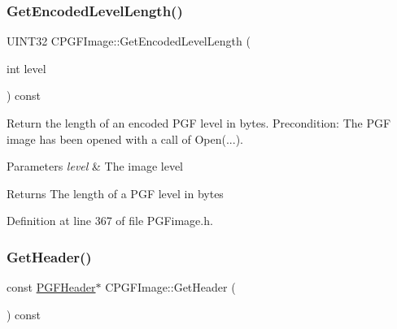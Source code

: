 \subsubsection{\texorpdfstring{GetEncodedLevelLength()}{GetEncodedLevelLength()}}
{\footnotesize\ttfamily U\+I\+N\+T32 C\+P\+G\+F\+Image\+::\+Get\+Encoded\+Level\+Length (\begin{DoxyParamCaption}\item[{int}]{level }\end{DoxyParamCaption}) const\hspace{0.3cm}{\ttfamily [inline]}}

Return the length of an encoded P\+GF level in bytes. Precondition\+: The P\+GF image has been opened with a call of Open(...). 
\begin{DoxyParams}{Parameters}
{\em level} & The image level \\
\hline
\end{DoxyParams}
\begin{DoxyReturn}{Returns}
The length of a P\+GF level in bytes 
\end{DoxyReturn}


Definition at line 367 of file P\+G\+Fimage.\+h.


\begin{DoxyCode}{0}

\end{DoxyCode}
\mbox{\label{classCPGFImage_a485b62ca1f9b649d6ff590fe28657cf3}} 
\subsubsection{\texorpdfstring{GetHeader()}{GetHeader()}}
{\footnotesize\ttfamily const \mbox{\hyperlink{structPGFHeader}{P\+G\+F\+Header}}$\ast$ C\+P\+G\+F\+Image\+::\+Get\+Header (\begin{DoxyParamCaption}{ }\end{DoxyParamCaption}) const\hspace{0.3cm}{\ttfamily [inline]}}

